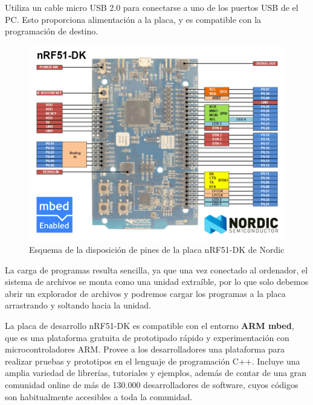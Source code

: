 Utiliza un cable micro USB 2.0 para conectarse a uno de los puertos USB de el PC. Esto proporciona alimentación a la placa, y es compatible con la programación de destino.

\begin{figure}[h]%
	\centering
    \includegraphics[scale=0.5]{figures/nRF51DK_pines.png} %

    \caption[Esquema de la disposición de pines de la placa nRF51-DK de Nordic]{Esquema de la disposición de pines de la placa nRF51-DK de Nordic}

   \label{figuraNordicNRF51}
\end{figure}

La carga de programas resulta sencilla, ya que una vez conectado al ordenador, el sistema de archivos se monta como una unidad extraíble, por lo que solo debemos abrir un explorador de archivos y podremos cargar los programas a la placa arrastrando y soltando hacia la unidad.

La placa de desarrollo nRF51-DK es compatible con el entorno \textbf{ARM mbed}, que es una plataforma gratuita de prototipado rápido y experimentación con microcontroladores ARM. Provee a los desarrolladores una plataforma para realizar pruebas y prototipos en el lenguaje de programación C++. Incluye una amplia variedad de librerías, tutoriales y ejemplos, además de contar de una gran comunidad online de más de 130.000 desarrolladores de software, cuyos códigos son habitualmente accesibles a toda la comunidad.

